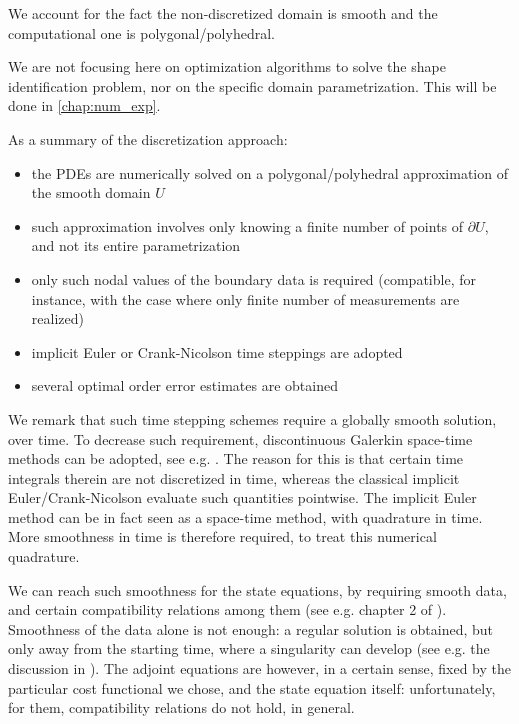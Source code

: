 \documentclass[english,a4paper,9pt,oneside]{scrbook}	%
\theoremstyle{break}
\theoremstyle{remark}
\begin{document}
We account for the fact the non-discretized domain is smooth and the computational one is polygonal/polyhedral. 

We are not focusing here on optimization algorithms to solve the shape identification problem, nor on the specific domain parametrization. This will be done in \cref{chap:num_exp}.


As a summary of the discretization approach:

\begin{itemize}
	\item the PDEs are numerically solved on a polygonal/polyhedral approximation of the smooth domain $U$
	\item such approximation involves only knowing a finite number of points of $\partial U$, and not its entire parametrization
	\item only such nodal values of the boundary data is required (compatible, for instance, with the case where only finite number of measurements are realized)
	\item implicit Euler or Crank-Nicolson time steppings are adopted
	\item several optimal order error estimates are obtained
\end{itemize}

We remark that such time stepping schemes require a globally smooth solution, over time. To decrease such requirement, discontinuous Galerkin space-time methods can be adopted, see e.g. \cite{vexler}. The reason for this is that certain time integrals therein are not discretized in time, whereas the classical implicit Euler/Crank-Nicolson evaluate such quantities pointwise. The implicit Euler method can be in fact seen as a space-time method, with quadrature in time. More smoothness in time is therefore required, to treat this numerical quadrature.

We can reach such smoothness for the state equations, by requiring smooth data, and certain compatibility relations among them (see e.g. chapter 2 of \cite{lions}). Smoothness of the data alone is not enough: a regular solution is obtained, but only away from the starting time, where a singularity can develop (see e.g. the discussion in \cite{harbrecht}). The adjoint equations are however, in a certain sense, fixed by the particular cost functional we chose, and the state equation itself: unfortunately, for them, compatibility relations do not hold, in general.
\end{document}
